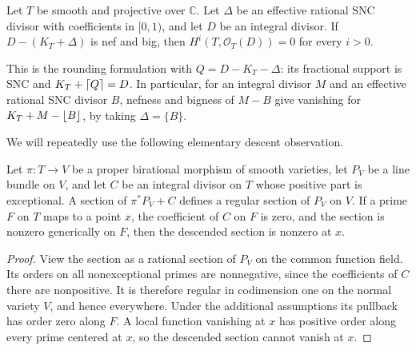 \begin{theorem}\label{thm:kv}
Let $T$ be smooth and projective over $\mathbb{C}$. Let $\Delta$ be an effective rational SNC divisor with coefficients in $[0,1)$, and let $D$ be an integral divisor. If $D-(K_T+\Delta)$ is nef and big, then $H^i(T,\mathcal{O}_T(D))=0$ for every $i>0$.
\end{theorem}

This is the rounding formulation with $Q=D-K_T-\Delta$: its fractional support is SNC and $K_T+\left \lceil{Q}\right \rceil=D$. In particular, for an integral divisor $M$ and an effective rational SNC divisor $B$, nefness and bigness of $M-B$ give vanishing for $K_T+M-\left \lfloor{B}\right \rfloor$, by taking $\Delta=\{B\}$.

We will repeatedly use the following elementary descent observation.
\begin{lemma}\label{lem:descent}
Let $\pi:T\to V$ be a proper birational morphism of smooth varieties, let $P_V$ be a line bundle on $V$, and let $C$ be an integral divisor on $T$ whose positive part is exceptional. A section of $\pi^*P_V+C$ defines a regular section of $P_V$ on $V$. If a prime $F$ on $T$ maps to a point $x$, the coefficient of $C$ on $F$ is zero, and the section is nonzero generically on $F$, then the descended section is nonzero at $x$.
\end{lemma}
\begin{proof}
View the section as a rational section of $P_V$ on the common function field. Its orders on all nonexceptional primes are nonnegative, since the coefficients of $C$ there are nonpositive. It is therefore regular in codimension one on the normal variety $V$, and hence everywhere. Under the additional assumptions its pullback has order zero along $F$. A local function vanishing at $x$ has positive order along every prime centered at $x$, so the descended section cannot vanish at $x$.
\end{proof}
